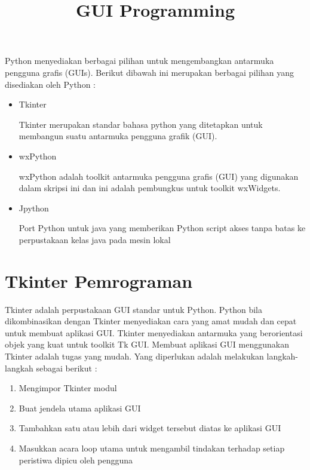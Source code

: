 \documentclass [12pt,a4paper,notitlepage,oneside,bahasa]{article}
\begin{document}
\title{\textbf GUI Programming}
\maketitle

Python menyediakan berbagai pilihan untuk mengembangkan antarmuka pengguna grafis (GUIs). 
Berikut dibawah ini merupakan berbagai pilihan yang disediakan oleh Python :
\begin{itemize}
\item Tkinter \par
Tkinter merupakan standar bahasa python yang ditetapkan untuk membangun suatu antarmuka pengguna grafik (GUI). 
\item wxPython \par
wxPython adalah toolkit antarmuka pengguna grafis (GUI) yang digunakan dalam skripsi ini dan ini adalah pembungkus untuk toolkit wxWidgets.
\item Jpython \par
Port Python untuk java yang memberikan Python script akses tanpa batas ke perpustakaan kelas java pada mesin lokal \par
\end{itemize}
\vspace{12pt}
\noindent 
\section{\textbf Tkinter Pemrograman}
Tkinter adalah perpustakaan GUI standar untuk Python. Python bila dikombinasikan dengan Tkinter menyediakan cara yang amat mudah dan cepat untuk membuat aplikasi GUI. Tkinter menyediakan antarmuka yang berorientasi objek yang kuat untuk toolkit Tk GUI.
 \hspace*{0.5in} Membuat aplikasi GUI menggunakan Tkinter adalah tugas yang mudah. Yang diperlukan adalah melakukan langkah-langkah sebagai berikut : 
\begin{enumerate} 
	\item Mengimpor Tkinter modul 
	\item Buat jendela utama aplikasi GUI
	\item Tambahkan satu atau lebih dari widget tersebut diatas ke aplikasi GUI
	\item Masukkan acara loop utama untuk mengambil tindakan terhadap setiap peristiwa dipicu oleh pengguna
\end{enumerate}

\end{document}
